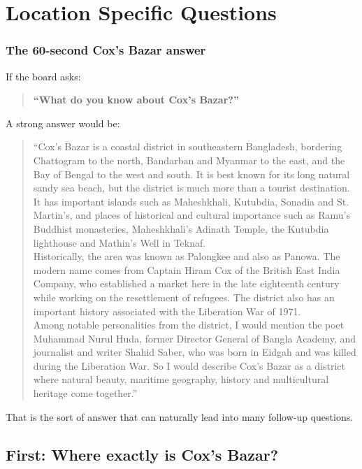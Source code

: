 \chapter{Location Specific Questions}
\label{ch:location}


\subsection{The 60-second Cox's Bazar answer}

If the board asks:

\begin{quote}
\textbf{``What do you know about Cox's Bazar?''}\\
\end{quote}

A strong answer would be:

\begin{quote}
``Cox's Bazar is a coastal district in southeastern Bangladesh, bordering Chattogram to the north, Bandarban and Myanmar to the east, and the Bay of Bengal to the west and south. It is best known for its long natural sandy sea beach, but the district is much more than a tourist destination. It has important islands such as Maheshkhali, Kutubdia, Sonadia and St. Martin's, and places of historical and cultural importance such as Ramu's Buddhist monasteries, Maheshkhali's Adinath Temple, the Kutubdia lighthouse and Mathin's Well in Teknaf.\\
Historically, the area was known as Palongkee and also as Panowa. The modern name comes from Captain Hiram Cox of the British East India Company, who established a market here in the late eighteenth century while working on the resettlement of refugees. The district also has an important history associated with the Liberation War of 1971.\\
Among notable personalities from the district, I would mention the poet Muhammad Nurul Huda, former Director General of Bangla Academy, and journalist and writer Shahid Saber, who was born in Eidgah and was killed during the Liberation War. So I would describe Cox's Bazar as a district where natural beauty, maritime geography, history and multicultural heritage come together.''\\
\end{quote}

That is the sort of answer that can naturally lead into many follow-up questions.

\medskip

\section{First: Where exactly is Cox's Bazar?}

